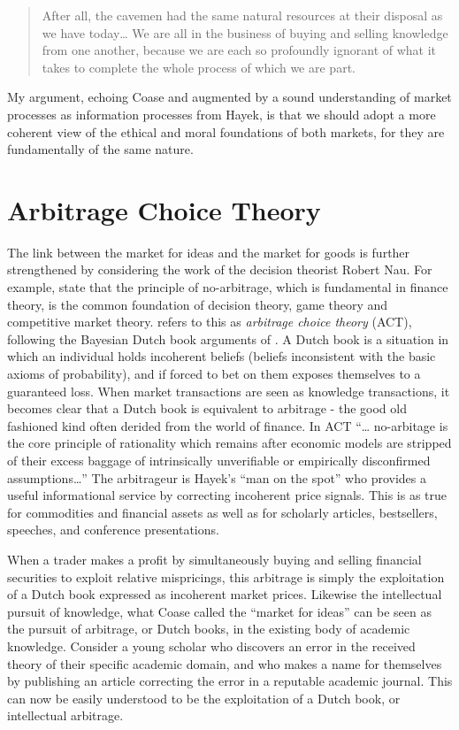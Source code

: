 \documentclass[11pt,]{article}
\begin{document}
\begin{quote}
After all, the cavemen had the same natural resources at their disposal
as we have today\ldots{} We are all in the business of buying and
selling knowledge from one another, because we are each so profoundly
ignorant of what it takes to complete the whole process of which we are
part.
\end{quote}

My argument, echoing Coase and augmented by a sound understanding of
market processes as information processes from Hayek, is that we should
adopt a more coherent view of the ethical and moral foundations of both
markets, for they are fundamentally of the same nature.

\section{Arbitrage Choice Theory}\label{arbitrage-choice-theory}

The link between the market for ideas and the market for goods is
further strengthened by considering the work of the decision theorist
Robert Nau. For example, \citet{NauMcCardle1991} state that the
principle of no-arbitrage, which is fundamental in finance theory, is
the common foundation of decision theory, game theory and competitive
market theory. \citet{Nau1999} refers to this as \emph{arbitrage choice
theory} (ACT), following the Bayesian Dutch book arguments of
\citet{deFinetti1937}. A Dutch book is a situation in which an
individual holds incoherent beliefs (beliefs inconsistent with the basic
axioms of probability), and if forced to bet on them exposes themselves
to a guaranteed loss. When market transactions are seen as knowledge
transactions, it becomes clear that a Dutch book is equivalent to
arbitrage - the good old fashioned kind often derided from the world of
finance. In ACT ``\ldots{} no-arbitage is the core principle of
rationality which remains after economic models are stripped of their
excess baggage of intrinsically unverifiable or empirically disconfirmed
assumptions\ldots{}'' The arbitrageur is Hayek's ``man on the spot'' who
provides a useful informational service by correcting incoherent price
signals. This is as true for commodities and financial assets as well as
for scholarly articles, bestsellers, speeches, and conference
presentations.

When a trader makes a profit by simultaneously buying and selling
financial securities to exploit relative mispricings, this arbitrage is
simply the exploitation of a Dutch book expressed as incoherent market
prices. Likewise the intellectual pursuit of knowledge, what Coase
called the ``market for ideas'' can be seen as the pursuit of arbitrage,
or Dutch books, in the existing body of academic knowledge. Consider a
young scholar who discovers an error in the received theory of their
specific academic domain, and who makes a name for themselves by
publishing an article correcting the error in a reputable academic
journal. This can now be easily understood to be the exploitation of a
Dutch book, or intellectual arbitrage.
\end{document}
